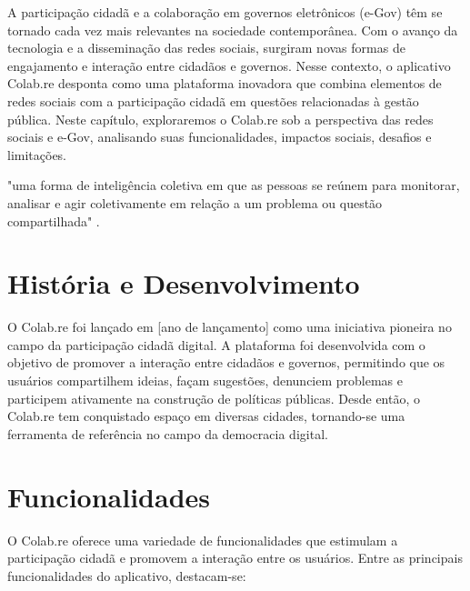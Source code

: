 A participação cidadã e a colaboração em governos eletrônicos (e-Gov) têm se tornado cada vez mais relevantes na sociedade contemporânea. Com o avanço da tecnologia e a disseminação das redes sociais, surgiram novas formas de engajamento e interação entre cidadãos e governos. Nesse contexto, o aplicativo Colab.re desponta como uma plataforma inovadora que combina elementos de redes sociais com a participação cidadã em questões relacionadas à gestão pública. Neste capítulo, exploraremos o Colab.re sob a perspectiva das redes sociais e e-Gov, analisando suas funcionalidades, impactos sociais, desafios e limitações.
\begin{citacao}
    "uma forma de inteligência coletiva em que as pessoas se reúnem para monitorar, analisar e agir coletivamente em relação a um problema ou questão compartilhada" \cite[p. 1]{2011_Bryer}.
\end{citacao}

\section*{História e Desenvolvimento}
O Colab.re foi lançado em [ano de lançamento] como uma iniciativa pioneira no campo da participação cidadã digital. A plataforma foi desenvolvida com o objetivo de promover a interação entre cidadãos e governos, permitindo que os usuários compartilhem ideias, façam sugestões, denunciem problemas e participem ativamente na construção de políticas públicas. Desde então, o Colab.re tem conquistado espaço em diversas cidades, tornando-se uma ferramenta de referência no campo da democracia digital.

\section{Funcionalidades}

O Colab.re oferece uma variedade de funcionalidades que estimulam a participação cidadã e promovem a interação entre os usuários. Entre as principais funcionalidades do aplicativo, destacam-se:

